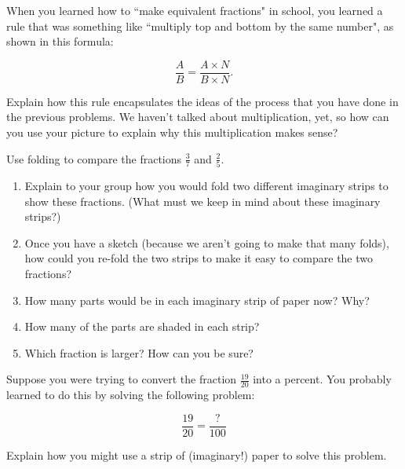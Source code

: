 \documentclass[nooutcomes,noauthor,handout]{ximera}
\begin{document}
\begin{problem}
When you learned how to ``make equivalent fractions" in school, you learned a rule that was something like ``multiply top and bottom by the same number", as shown in this formula:

  \[ \frac{A}{B} = \frac{A \times N}{B \times N}. \]

Explain how this rule encapsulates the ideas of the process that you have done in the previous problems. We haven't talked about multiplication, yet, so how can you use your picture to explain why this multiplication makes sense?  %
\end{problem}

\newpage

\begin{problem}
 Use folding to compare the fractions $\frac{3}{7}$ and $\frac{2}{5}$. 
\begin{enumerate}
    \item Explain to your group how you would fold two different imaginary strips to show these fractions. (What must we keep in mind about these imaginary strips?)   
    \item Once you have a sketch (because we aren't going to make that many folds), how could you re-fold the two strips to make it easy to compare the two fractions? 
   \item How many parts would be in each imaginary strip of paper now? Why?
    \item   How many of the parts are shaded in each strip?
    \item   Which fraction is larger?  How can you be sure? 
\end{enumerate}
\end{problem}

\begin{problem}
Suppose you were trying to convert the fraction $\frac{19}{20}$ into a percent.  You probably learned to do this by solving the following problem:

\[ \frac{19}{20} = \frac{?}{100} \]

Explain how you might use a strip of (imaginary!) paper  to solve this problem.
\end{problem}





\newpage
\end{document}
